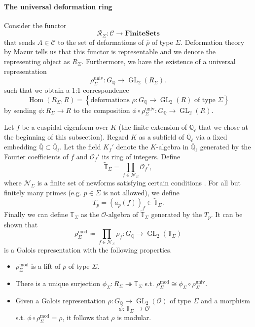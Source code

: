 \documentclass{article}
\theoremstyle{plain}%
\theoremstyle{definition}
\theoremstyle{remark}
\renewcommand{\hom}{\operatorname{Hom}}
\newcommand{\GL}{\operatorname{GL}}
\begin{document}
\paragraph{The universal deformation ring}
Consider the functor
\[
    \mathcal{R}_\Sigma \colon \mathcal{C} \to \mathrm{\mathbf{FiniteSets}}  
\]
that sends \(A \in \mathcal{C}\) to the set of deformations of \(\overline{\rho}\) of type \(\Sigma\).
Deformation theory by Mazur tells us that this functor is representable and we 
denote the representing object as \(R_\Sigma\).
Furthermore, we have the existence of a universal representation
\[ 
    \rho_\Sigma^\mathrm{univ}\colon G_\mathbb{Q} \to \GL_2(R_\Sigma).
\]
such that we obtain a 1:1 correspondence
\[
    \hom(R_\Sigma, R) = \left\{\text{deformations } \rho \colon G_\mathbb{Q} \to \GL_2(R) \text{ of type }\Sigma\right\}  
\]
by sending \(\phi \colon R_\Sigma \to R\) to the composition
\(\phi \circ \rho_\Sigma^\mathrm{univ}\colon G_\mathbb{Q} \to \GL_2(R)\).

Let \(f\) be a cuspidal eigenform over \(K\) (the finite extension of \(\mathbb{Q}_\ell\) that we
chose at the beginning of this subsection). Regard \(K\) as a subfield of \(\overline{\mathbb{Q}}_\ell\) 
via a fixed embedding \(\overline{\mathbb{Q}} \subset \overline{\mathbb{Q}}_\ell\).
Let the field \(K_f'\) denote the \(K\)-algebra in \(\overline{\mathbb{Q}}_\ell\) generated by
the Fourier coefficients of \(f\) and \(\mathcal{O}_f'\) its ring of integers.
Define
\[
    \tilde{\mathbb{T}}_\Sigma = \prod_{f \in \mathcal{N}_\Sigma} \mathcal{O}_f',
\]
where \(\mathcal{N}_\Sigma\) is a finite set of newforms satisfying certain conditions \cite[see][lemma 3.26]{Darmon1995}.
For all but finitely many primes (e.g. \(p \in \Sigma\) is not allowed), we define
\[
    T_p = (a_p(f))_{f} \in \tilde{\mathbb{T}}_\Sigma.
\]
Finally we can define \(\mathbb{T}_\Sigma\) as the \(\mathcal{O}\)-algebra of \(\tilde{\mathbb{T}}_\Sigma\)
generated by the \(T_p\).
It can be shown \cite[cf.][lemma 3.27]{Darmon1995} that
\[
    \rho_\Sigma^\mathrm{mod} \coloneqq \prod_{f\in \mathcal{N}_\Sigma} \rho_f \colon G_\mathbb{Q} \to \GL_2(\mathbb{T}_\Sigma)
\]
is a Galois representation with the following properties.
\begin{itemize}
    \item \(\rho_\Sigma^\mathrm{mod}\) is a lift of \(\overline{\rho}\) of type \(\Sigma\).
    \item There is a unique surjection \(\phi_\Sigma\colon R_\Sigma \twoheadrightarrow \mathbb{T}_\Sigma\) 
    s.t. \(\rho_\Sigma^\mathrm{mod} \cong \phi_\Sigma \circ \rho_\Sigma^\mathrm{univ}\).
    \item Given a Galois representation \(\rho\colon G_\mathbb{Q} \to \GL_2(\mathcal{O})\) of type \(\Sigma\) and a morphism 
    \[
        \phi \colon \mathbb{T}_\Sigma \to \mathcal{O}
    \]
    s.t. \(\phi \circ \rho^{\mathrm{mod}}_{\Sigma} = \rho\), it follows that \(\rho\) is modular.
\end{itemize}
\end{document}
